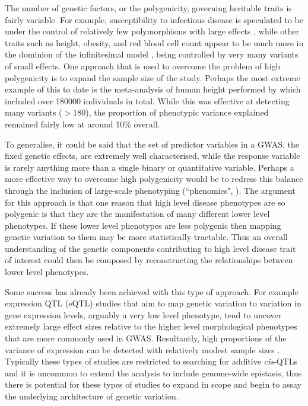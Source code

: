 The number of genetic factors, or the polygenicity, governing heritable traits is fairly variable. For example, susceptibility to infectious disease is speculated to be under the control of relatively few polymorphisms with large effects \citep{Min-Oo2003, Diez2003}, while other traits such as height, obesity, and red blood cell count appear to be much more in the dominion of the infinitesimal model \citep{Valdar2006, Park2010}, being controlled by very many variants of small effects. One approach that is used to overcome the problem of high polygenicity is to expand the sample size of the study. Perhaps the most extreme example of this to date is the meta-analysis of human height performed by \citet{LangoAllen2010} which included over 180000 individuals in total. While this was effective at detecting many variants ($>180$), the proportion of phenotypic variance explained remained fairly low at around 10\% overall.

To generalise, it could be said that the set of predictor variables in a GWAS, the fixed genetic effects, are extremely well characterised, while the response variable is rarely anything more than a single binary or quantitative variable. Perhaps a more effective way to overcome high polygenicity would be to redress this balance through the inclusion of large-scale phenotyping (``phenomics", \citet{Sabb2009, Houle2010}). The argument for this approach is that one reason that high level disease phenotypes are so polygenic is that they are the manifestation of many different lower level phenotypes. If these lower level phenotypes are less polygenic then mapping genetic variation to them may be more statistically tractable. Thus an overall understanding of the genetic components contributing to high level disease trait of interest could then be composed by reconstructing the relationships between lower level phenotypes.

Some success has already been achieved with this type of approach. For example expression QTL (eQTL) studies that aim to map genetic variation to variation in gene expression levels, arguably a very low level phenotype, tend to uncover extremely large effect sizes relative to the higher level morphological phenotypes that are more commonly used in GWAS. Resultantly, high proportions of the variance of expression can be detected with relatively modest sample sizes \citep{Bystrykh2005, Cookson2009}. Typically these types of studies are restricted to searching for additive \emph{cis}-QTLs and it is uncommon to extend the analysis to include genome-wide epistasis, thus there is potential for these types of studies to expand in scope and begin to assay the underlying architecture of genetic variation.

